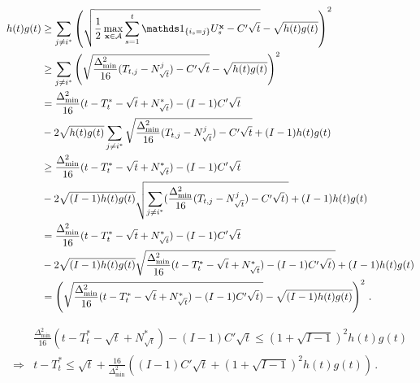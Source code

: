 \begin{align*}
    h(t)g(t) &\ge \sum_{j\neq i^*} \left(\sqrt{\frac{1}{2}\max_{\bx\in \mathcal A} \sum_{s=1}^t \ind_{\{i_s=j\}} U_s^\bx - C'\sqrt{t}} - \sqrt{h(t)g(t)}\right)^2\\
    &\ge \sum_{j\neq i^*} \left(\sqrt{\frac{\Delta_{\min}^2}{16} (T_{t,j} - N_{\sqrt{t}}^j) - C'\sqrt{t}} - \sqrt{h(t)g(t)}\right)^2\\
    &= \frac{\Delta_{\min}^2}{16} (t - T_t^* - \sqrt{t} + N_{\sqrt{t}}^*) - (I-1)C'\sqrt{t}\\
    &- 2\sqrt{h(t)g(t)}\sum_{j\neq i^*}\sqrt{\frac{\Delta_{\min}^2}{16} (T_{t,j} - N_{\sqrt{t}}^j) - C'\sqrt{t}} + (I-1)h(t)g(t)\\
    &\ge \frac{\Delta_{\min}^2}{16} (t - T_t^* - \sqrt{t} + N_{\sqrt{t}}^*) - (I-1)C'\sqrt{t}\\
    &- 2\sqrt{(I-1) h(t)g(t)}\sqrt{\sum_{j\neq i^*}(\frac{\Delta_{\min}^2}{16} (T_{t,j} - N_{\sqrt{t}}^j) - C'\sqrt{t})} + (I-1)h(t)g(t)\\
    &= \frac{\Delta_{\min}^2}{16} (t - T_t^* - \sqrt{t} + N_{\sqrt{t}}^*) - (I-1)C'\sqrt{t}\\
    &- 2\sqrt{(I-1) h(t)g(t)}\sqrt{\frac{\Delta_{\min}^2}{16} (t - T_t^* - \sqrt{t} + N_{\sqrt{t}}^*) - (I-1)C'\sqrt{t})} + (I-1)h(t)g(t)\\
    &= \left( \sqrt{\frac{\Delta_{\min}^2}{16} (t - T_t^* - \sqrt{t} + N_{\sqrt{t}}^*) - (I-1)C'\sqrt{t})} - \sqrt{(I-1) h(t)g(t)} \right)^2\,.
\end{align*}

\begin{align*}
    &\frac{\Delta_{\min}^2}{16} (t - T_t^* - \sqrt{t} + N_{\sqrt{t}}^*) - (I-1)C'\sqrt{t} \le (1 + \sqrt{I-1})^2 h(t)g(t)\\
    \Rightarrow
    &t - T_t^*
    \le \sqrt{t} + \frac{16}{\Delta_{\min}^2}\left((I-1)C'\sqrt{t} + (1 + \sqrt{I-1})^2 h(t)g(t)\right)\,.
\end{align*}